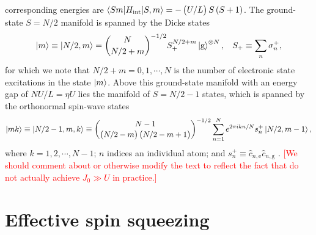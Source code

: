 \documentclass[aps,notitlepage,nofootinbib,11pt]{revtex4-1}
\renewcommand{\t}{\text} %
\newcommand{\p}[1]{\left(#1\right)} %
\newcommand{\bk}{\braket} %
\newcommand{\g}{\text{g}} %
\newcommand{\e}{\text{e}}
\newcommand{\1}{\hat{\mathds{1}}}
\newcommand{\note}[1]{\textcolor{red}{#1}}
\begin{document}
corresponding energies are $\bk{Sm|H_{\t{int}}|S,m}=-\p{U/L}S\p{S+1}$.
The ground-state $S=N/2$ manifold is spanned by the Dicke states
\begin{align}
  \ket{m} \equiv \ket{N/2,m}
  = {N \choose N/2+m}^{-1/2} S_+^{N/2+m} \ket{\g}^{\otimes N},
  &&
  S_+ \equiv \sum_n \sigma_n^+,
\end{align}
for which we note that $N/2+m=0,1,\cdots,N$ is the number of
electronic state excitations in the state $\ket{m}$.  Above this
ground-state manifold with an energy gap of $NU/L=\eta U$ lies the
manifold of $S=N/2-1$ states, which is spanned by the orthonormal
spin-wave states
\begin{align}
  \ket{mk}
  \equiv \ket{N/2-1,m,k}
  \equiv {N-1 \choose \p{N/2-m}\p{N/2-m+1}}^{-1/2}
  \sum_{n=1}^N e^{2\pi ikn/N} s_n^+ \ket{N/2,m-1},
\end{align}
where $k=1,2,\cdots,N-1$; $n$ indices an individual atom; and
$s_n^+\equiv\hat c_{n,\e}\hat c_{n,\g}$
\cite{swallows2011suppression}.  \note{[We should comment about or
  otherwise modify the text to reflect the fact that do not actually
  achieve $J_0\gg U$ in practice.]}


\section{Effective spin squeezing}
\label{sec:OAT}
\end{document}
